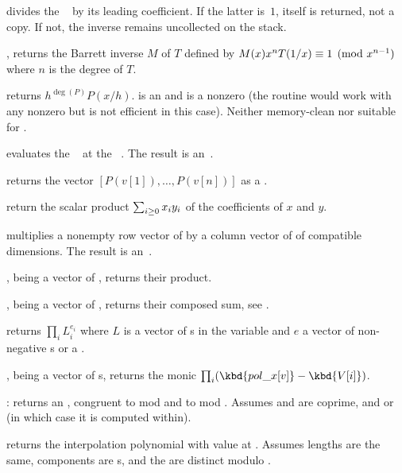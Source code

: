  divides the ~ by its
leading coefficient. If the latter is~$1$,  itself is returned, not a
copy. If not, the inverse remains uncollected on the stack.

, returns the Barrett inverse
$M$ of $T$ defined by $M(x)\*x^n\*T(1/x)\equiv 1\pmod{x^{n-1}}$ where $n$ is
the degree of $T$.

 returns $h^{\deg(P)} P(x/h)$.
 is an  and  is a nonzero  (the routine would
work with any nonzero  but is not efficient in this case).
Neither memory-clean nor suitable for .

 evaluates the ~
at the ~. The result is an~.

 returns the vector
$[P(v[1]),\ldots,P(v[n])]$ as a .

 return the scalar product
$\sum_{i\geq 0} x_i\*y_i$ of the coefficients of $x$ and $y$.

 multiplies a nonempty row
vector of  by a column vector of  of compatible dimensions.
The result is an~.

,  being a vector of ,
returns their product.

,  being a vector of ,
returns their composed sum, see .

 returns
$\prod_i L_i^{e_i}$ where $L$ is a vector of s in the variable 
and $e$ a vector of non-negative s or a .

,  being a vector
of s, returns the monic 
$\prod_i (\kbd{pol\_x[v]} - \kbd{V[i]})$.

:
returns an , congruent to  mod  and to  mod
. Assumes  and  are coprime, and 
or  (in which case it is computed within).

 returns the 
interpolation polynomial with value  at . Assumes lengths
are the same, components are s, and the  are distinct
modulo .

